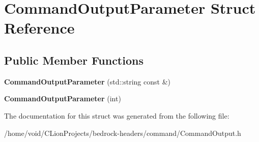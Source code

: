 \hypertarget{struct_command_output_parameter}{}\section{Command\+Output\+Parameter Struct Reference}
\label{struct_command_output_parameter}
\subsection*{Public Member Functions}
\begin{DoxyCompactItemize}
\item 
\mbox{\label{struct_command_output_parameter_aa481842d649241f1f38c93f731ccc96d}} 
{\bfseries Command\+Output\+Parameter} (std\+::string const \&)
\item 
\mbox{\label{struct_command_output_parameter_a8ac4fc1dec97ea709eada99f6c8a8413}} 
{\bfseries Command\+Output\+Parameter} (int)
\end{DoxyCompactItemize}


The documentation for this struct was generated from the following file\+:\begin{DoxyCompactItemize}
\item 
/home/void/\+C\+Lion\+Projects/bedrock-\/headers/command/Command\+Output.\+h\end{DoxyCompactItemize}
